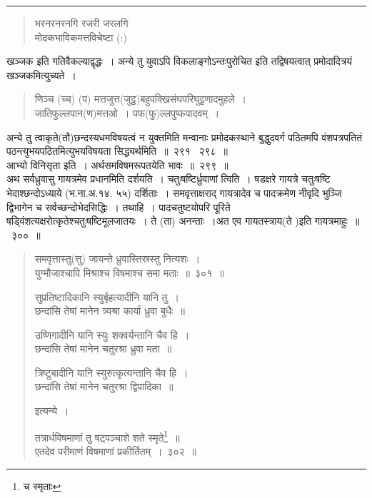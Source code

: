 \documentclass[11pt, openany]{book}
\begin{document}
\hrule

\begin{quote}
{\qt भरनरनरनगि रजरी जरलगि \\
 मोदकभाविकमत्तविचेष्टा (:) }
\end{quote}

\noindent
{\small {\qtt खञ्जक} इति गतिवैकल्याद्वृद्धः~। {\qtt अन्ये} तु युवाऽपि विकलाङ्गोऽन्तःपुरोचित इति तद्विषयत्वात् {\qtt प्रमोदा}दित्रयं {\qtt खञ्जक}मित्युच्यते~।

\begin{quote}
{\qt णिञ्च (च्च) (प) मत्तजुत्त(जुट्ठ)बहुपक्खिसंघपरिघुट्टणादमुहले~। \\
 जातिफुल्लपान(ण)मत्तओ~। पफ(फु)ल्लपुप्फपादवम्~।}
\end{quote}

\noindent
{\qtt अन्ये} तु त्वाकृते(तौ)छन्दस्यधमविषयत्वं न युक्तमिति मन्वानाः {\qtt प्रमोदकस्थाने} बुद्धुदवर्ग पठितमपि {\qtt वंशपत्रपतितं} पठन्त्युभयपठितमित्युभयविषयता सिद्ध्यर्थमिति~॥~२९१ \textendash\ २९८~॥\\

आभ्यो विनिसृता इति~। अर्थसमविषमरूपतयेति भावः~॥~२९९~॥\\

अथ सर्वध्रुवासु गायत्रमेव प्रधानमिति दर्शयति~। {\qtt चतुःषष्टिर्ध्रुवाणां त्विति}~। षडक्षरे गायत्रे {\qtt चतुःषष्टि भेदाश्छन्दोऽध्याये} (भ.ना.अ.१४. ५५) दर्शिताः~। {\qtt समवृत्ताक्षराद्} गायत्रादेव च पादक्रमेण नीवृदि भुञ्जि द्विभागेन च सर्वच्छन्दोभेदसिद्धिः~। तथाहि~। पादचतुष्टयोपरि पूरिते षड्विंशत्यक्षरोत्कृते{\qtt श्चतुःषष्टिमूलजातयः}~। ते (ता) अनन्ताः~।अत एव गायतस्त्राय(ते )इति गायत्रमाहुः~॥~३००~॥}

\newpage

\begin{quote}
{\na समवृत्तास्तु(त्तु) जायन्ते ध्रुवास्तिस्रस्तु नित्यशः~। \\
 युग्मौजाश्चापि मिश्राश्च विषमाश्च समा मताः~॥~३०१~॥}

{\qt सुप्रतिष्टादिकानि स्युर्बृहत्यादीनि यानि तु~। \\
 छन्दांसि तेषां मानेन त्र्यश्रा कार्या ध्रुवा बुधैः~॥

 उष्णिगादीनि यानि स्युः शक्वर्यन्तानि चैव हि~।\\
 छन्दांसि तेषां मानेन चतुरश्रा ध्रुवा मता~॥

 त्रिष्टुबादीनि यानि स्युरुत्कृत्यन्तानि चैव हि~। \\
 छन्दांसि तेषां मानेन चतुरश्रा द्विपादिका~॥}

 इत्यन्ये~। 

{\na तत्रार्धविषमाणां तु षट्पञ्चाशे शते स्मृते\renewcommand{\thefootnote}{1}\footnote{च स्मृताः}~॥\\
 एतदेव परीमाणं विषमाणां प्रकीर्तितम्~।~३०२~॥}
\end{quote}
\end{document}

